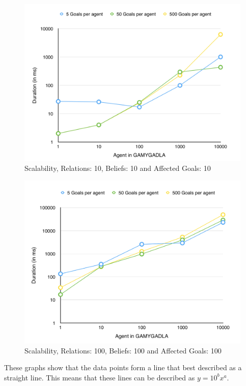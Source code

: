 \begin{figure}[H]
  \centering
  \includegraphics[scale=0.5]{scalability/2.jpg}
  \caption{Scalability, Relations: 10, Beliefs: 10 and Affected Goals: 10}
  \label{scala:second}
\end{figure}

\begin{figure}[H]
  \centering
  \includegraphics[scale=0.5]{scalability/3.jpg}
  \caption{Scalability, Relations: 100, Beliefs: 100 and Affected Goals: 100}
  \label{scala:third}
\end{figure}

These graphs show that the data points form a line that best described as a straight line. This means that these lines can be described as $y = 10^b x^a$.